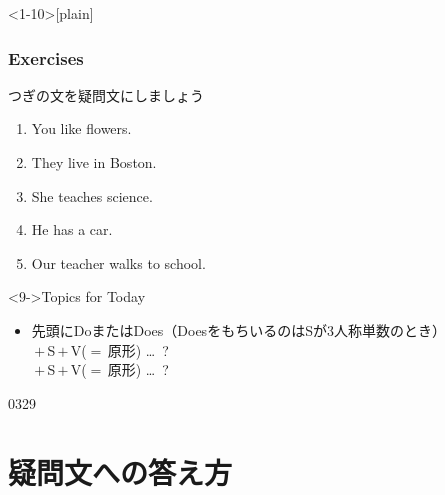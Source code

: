\documentclass[aspectratio=169,dvipsnames]{beamer}
\newcommand{\myaudio}[1]{\href{#1}{\faVolumeUp}}
\begin{document}
\begin{frame}<1-10>[plain]\frametitle{Exercises}

つぎの文を疑問文にしましょう

 \begin{enumerate}
  \item<1-> You like flowers.\hspace{59.7pt}
  \item<1-> They live in Boston.\hspace{47.5pt}%
        \hfill{}
  \item<1-> She teaches science.\hspace{42pt}%
  \item<5-> He has  a car.\hspace{80.5pt}%
  \item<7-> Our teacher walks to school.
 \end{enumerate}

\begin{block}<9->{Topics for Today}\small
\begin{itemize}[square]
 \item   先頭にDoまたはDoes（DoesをもちいるのはSが3人称単数のとき）\\
	 \,$+$\,S\,$+$\,V{\scriptsize ($=$\,原形)} \ldots\,\,\,?\\
	 \,$+$\,S\,$+$\,V{\scriptsize ($=$\,原形)} \ldots\,\,\,?
\end{itemize}
     \end{block}

\vspace{-10pt}

\hfill{\tiny 0329}\,{\scriptsize \myaudio{./audio/010_question_do_06.mp3}}

\end{frame}
\section{疑問文への答え方}
\end{document}
